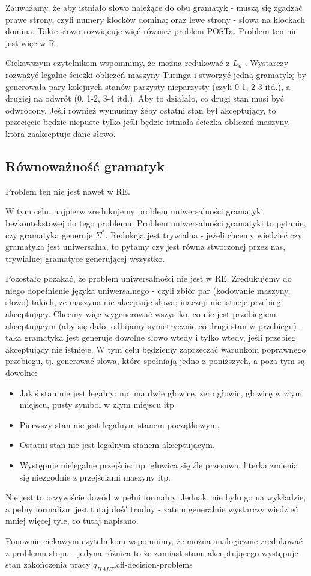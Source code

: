 Zauważamy, że aby istniało słowo należące do obu gramatyk - muszą się zgadzać prawe strony, czyli numery klocków domina; oraz lewe strony - słowa na klockach domina. Takie słowo rozwiącuje więć również problem POSTa. Problem ten nie jest więc w R.

Ciekawszym czytelnikom wspomnimy, że można redukować z \( L_u \) . Wystarczy rozważyć legalne ścieżki obliczeń maszyny Turinga i stworzyć jedną gramatykę by generowała pary kolejnych stanów parzysty-nieparzysty (czyli 0-1, 2-3 itd.), a drugiej na odwrót (0, 1-2, 3-4 itd.). Aby to działało, co drugi stan musi być odwrócony. Jeśli również wymusimy żeby ostatni stan był akceptujący, to przecięcie będzie niepuste tylko jeśli będzie istniała ścieżka obliczeń maszyny, która zaakceptuje dane słowo.

\subsection{Równoważność gramatyk}

Problem ten nie jest nawet w RE.

W tym celu, najpierw zredukujemy problem uniwersalności gramatyki bezkontekstowej do tego problemu. Problem uniwersalności gramatyki to pytanie, czy gramatyka generuje \( \Sigma^* \). Redukcja jest trywialna - jeżeli chcemy wiedzieć czy gramatyka jest uniwersalna, to pytamy czy jest równa stworzonej przez nas, trywialnej gramatyce generującej wszystko.

Pozostało pozakać, że problem uniwersalności nie jest w RE. Zredukujemy do niego dopełnienie języka uniwersalnego - czyli zbiór par (kodowanie maszyny, słowo) takich, że maszyna nie akceptuje słowa; inaczej: nie istneje przebieg akceptujący. Chcemy więc wygenerować wszystko, co nie jest przebiegiem akceptującym (aby się dało, odbijamy symetrycznie co drugi stan w przebiegu) - taka gramatyka jest generuje dowolne słowo wtedy i tylko wtedy, jeśli przebieg akceptujący nie istnieje. W tym celu będziemy zaprzeczać warunkom poprawnego przebiegu, tj. generować słowa, które spełniają jedno z poniższych, a poza tym są dowolne:

\begin{itemize}
    \item Jakiś stan nie jest legalny: np. ma dwie głowice, zero głowic, głowicę w złym miejscu, pusty symbol w złym miejscu itp.
    \item Pierwszy stan nie jest legalnym stanem początkowym.
    \item Ostatni stan nie jest legalnym stanem akceptującym.
    \item Występuje nielegalne przejście: np. głowica się źle przesuwa, literka zmienia się niezgodnie z przejściami maszyny itp.
\end{itemize}

Nie jest to oczywiście dowód w pełni formalny. Jednak, nie było go na wykładzie, a pełny formalizm jest tutaj dość trudny - zatem generalnie wystarczy wiedzieć mniej więcej tyle, co tutaj napisano.

Ponownie ciekawym czytelnikom wspomnimy, że można analogicznie zredukować z problemu stopu - jedyna różnica to że zamiast stanu akceptującego występuje stan zakończenia pracy \( q_{HALT} \).cfl-decision-problems
